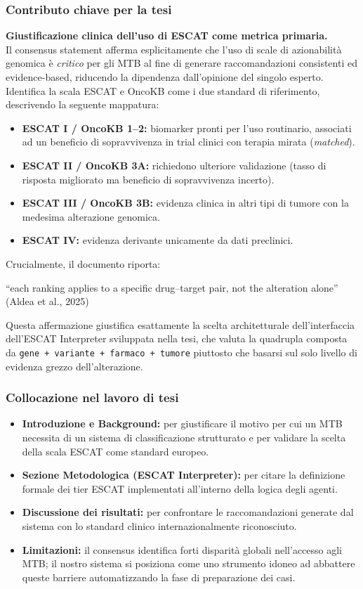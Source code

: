 \documentclass[11pt,a4paper]{article}
\newcommand{\code}[1]{\texttt{\small #1}}
\begin{document}
\subsubsection*{Contributo chiave per la tesi}
\textbf{Giustificazione clinica dell'uso di ESCAT come metrica primaria.}\\
Il consensus statement afferma esplicitamente che l'uso di scale di azionabilità genomica è \emph{critico} per gli MTB al fine di generare raccomandazioni consistenti ed evidence-based, riducendo la dipendenza dall'opinione del singolo esperto. Identifica la scala ESCAT e OncoKB come i due standard di riferimento, descrivendo la seguente mappatura:
\begin{itemize}
  \item \textbf{ESCAT I / OncoKB 1--2:} biomarker pronti per l'uso routinario, associati ad un beneficio di sopravvivenza in trial clinici con terapia mirata (\emph{matched}).
  \item \textbf{ESCAT II / OncoKB 3A:} richiedono ulteriore validazione (tasso di risposta migliorato ma beneficio di sopravvivenza incerto).
  \item \textbf{ESCAT III / OncoKB 3B:} evidenza clinica in altri tipi di tumore con la medesima alterazione genomica.
  \item \textbf{ESCAT IV:} evidenza derivante unicamente da dati preclinici.
\end{itemize}

Crucialmente, il documento riporta:
\begin{quotebox}
``each ranking applies to a specific drug--target pair, not the alteration alone'' \hfill (Aldea et al., 2025)
\end{quotebox}
Questa affermazione giustifica esattamente la scelta architetturale dell'interfaccia dell'ESCAT Interpreter sviluppata nella tesi, che valuta la quadrupla composta da \code{gene + variante + farmaco + tumore} piuttosto che basarsi sul solo livello di evidenza grezzo dell'alterazione.

\subsubsection*{Collocazione nel lavoro di tesi}
\begin{itemize}
  \item \textbf{Introduzione e Background:} per giustificare il motivo per cui un MTB necessita di un sistema di classificazione strutturato e per validare la scelta della scala ESCAT come standard europeo.
  \item \textbf{Sezione Metodologica (ESCAT Interpreter):} per citare la definizione formale dei tier ESCAT implementati all'interno della logica degli agenti.
  \item \textbf{Discussione dei risultati:} per confrontare le raccomandazioni generate dal sistema con lo standard clinico internazionalmente riconosciuto.
  \item \textbf{Limitazioni:} il consensus identifica forti disparità globali nell'accesso agli MTB; il nostro sistema si posiziona come uno strumento idoneo ad abbattere queste barriere automatizzando la fase di preparazione dei casi.
\end{itemize}
\end{document}
